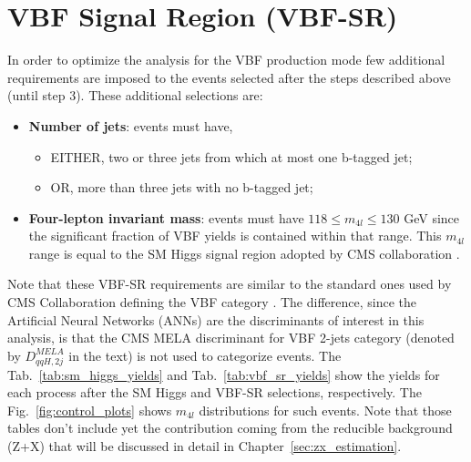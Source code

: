 \section{VBF Signal Region (VBF-SR)}
\label{subsec:vbf_sr}
In order to optimize the analysis for the VBF production mode few additional requirements are imposed to the events selected after the steps described above (until step 3). These additional selections are:
\begin{itemize}
	\item \textbf{Number of jets}: events must have,
	\begin{itemize}
		\item EITHER, two or three jets from which at most one b-tagged jet;
		\item OR, more than three jets with no b-tagged jet;
	\end{itemize}
	\item \textbf{Four-lepton invariant mass}: events must have $118 \leq m_{4l} \leq 130$ GeV since the significant fraction of VBF yields is contained within that range. This $m_{4l}$ range is equal to the SM Higgs signal region adopted by CMS collaboration \cite{bib:JHEP11_047_2017}.
\end{itemize} 

Note that these VBF-SR requirements are similar to the standard ones used by CMS Collaboration defining the VBF category \cite{bib:JPhys-447-1-2013,bib:CMS-AN-16-442}. The difference, since the Artificial Neural Networks (ANNs) are the discriminants of interest in this analysis, is that the CMS MELA discriminant for VBF 2-jets category (denoted by $D_{qqH,2j}^{MELA}$ in the text) is not used to categorize events. The Tab.~\ref{tab:sm_higgs_yields} and Tab.~\ref{tab:vbf_sr_yields} show the yields for each process after the SM Higgs and VBF-SR selections, respectively. The Fig.~\ref{fig:control_plots} shows $m_{4l}$ distributions for such events. Note that those tables don't include yet the contribution coming from the reducible background (Z+X) that will be discussed in detail in Chapter~\ref{sec:zx_estimation}.

